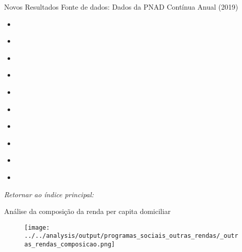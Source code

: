 \begin{frame}[label=_novos_resultados]{Novos Resultados}
{\footnotesize Fonte de dados: Dados da PNAD Contínua Anual (2019)}



\begin{itemize}
\item{
	\hyperlink{_outras_rendas_composicao}{}
	}
\item{
	\hyperlink{_outras_rendas_composicao1}{}
	} 
\item{
	\hyperlink{_outras_rendas_composicao2}{}
	} 
\item{
	\hyperlink{_outras_rendas_composicao3}{}
	} 
\item{
	\hyperlink{_outras_rendas_composicao3}{}
	} 		
\item{
	\hyperlink{_outras_rendas_composicao3}{}
	} 
\item{
	\hyperlink{_outras_rendas_composicao4}{}
	} 
\item{
	\hyperlink{_outras_rendas_composicao5}{}
	} 
\item{
	\hyperlink{_outras_rendas_composicao}{}
	} 
\item{
	\hyperlink{_outras_rendas_composicao}{}
	} 	

\end{itemize}
\begin{small}
\textit{Retornar ao índice principal: \hyperlink{indice_principal}{} }
\end{small}
\end{frame}


\begin{frame}[label=_outras_rendas_composicao]{{\small Análise da composição da renda per capita domiciliar}}
\textit{\hyperlink{_novos_resultados}{}}
\begin{figure}
  \centering
  \texttt{[image: ../../analysis/output/programas\_sociais\_outras\_rendas/\_outras\_rendas\_composicao.png]}
  \caption{}
  \label{fig:_outras_rendas_composicao}
\end{figure}
\end{frame}


